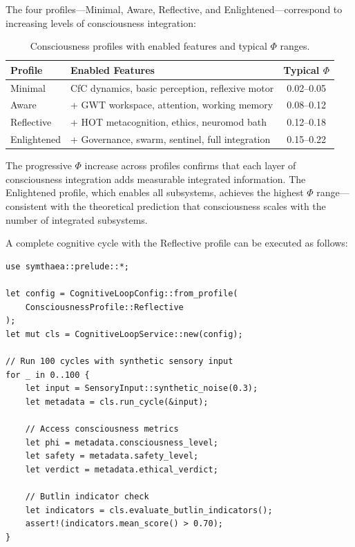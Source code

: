 \documentclass[12pt]{book}
\begin{document}
The four profiles---Minimal, Aware, Reflective, and Enlightened---correspond to increasing levels of consciousness integration:

\begin{table}[H]
\centering
\caption{Consciousness profiles with enabled features and typical $\Phi$ ranges.}
\label{tab:profiles}
\begin{tabular}{lp{5cm}c}
\toprule
\textbf{Profile} & \textbf{Enabled Features} & \textbf{Typical $\Phi$} \\
\midrule
Minimal & CfC dynamics, basic perception, reflexive motor & 0.02--0.05 \\
Aware & + GWT workspace, attention, working memory & 0.08--0.12 \\
Reflective & + HOT metacognition, ethics, neuromod bath & 0.12--0.18 \\
Enlightened & + Governance, swarm, sentinel, full integration & 0.15--0.22 \\
\bottomrule
\end{tabular}
\end{table}

The progressive $\Phi$ increase across profiles confirms that each layer of consciousness integration adds measurable integrated information. The Enlightened profile, which enables all subsystems, achieves the highest $\Phi$ range---consistent with the theoretical prediction that consciousness scales with the number of integrated subsystems.

A complete cognitive cycle with the Reflective profile can be executed as follows:

\begin{lstlisting}[caption={Running a complete cognitive cycle with the Butlin validation.},label=lst:butlin-validation]
use symthaea::prelude::*;

let config = CognitiveLoopConfig::from_profile(
    ConsciousnessProfile::Reflective
);
let mut cls = CognitiveLoopService::new(config);

// Run 100 cycles with synthetic sensory input
for _ in 0..100 {
    let input = SensoryInput::synthetic_noise(0.3);
    let metadata = cls.run_cycle(&input);

    // Access consciousness metrics
    let phi = metadata.consciousness_level;
    let safety = metadata.safety_level;
    let verdict = metadata.ethical_verdict;

    // Butlin indicator check
    let indicators = cls.evaluate_butlin_indicators();
    assert!(indicators.mean_score() > 0.70);
}
\end{lstlisting}
\end{document}
